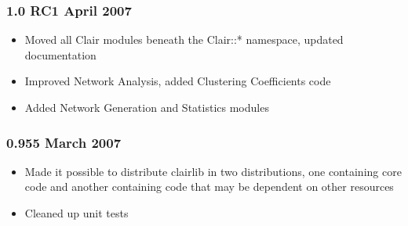 \subsubsection*{1.0 RC1 April 2007\label{1_0_RC1_April_2007}}
\begin{itemize}

\item Moved all Clair modules beneath the Clair::* namespace, updated documentation
\item Improved Network Analysis, added Clustering Coefficients code
\item Added Network Generation and Statistics modules\end{itemize}
\subsubsection*{0.955 March 2007\label{0_955_March_2007}}
\begin{itemize}

\item Made it possible to distribute clairlib in two distributions, one containing core code and another containing code that may be dependent on other resources
\item Cleaned up unit tests\end{itemize}
